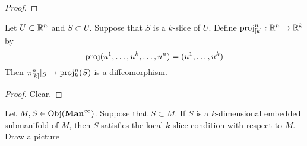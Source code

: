 \documentclass{book}
\begin{document}
	\begin{proof}
	\end{proof}

	\begin{ex}
		Let $U \subset \mathbb{R}^n$ and $S \subset U$. Suppose that $S$ is a $k$-slice of $U$. Define $\operatorname{\text{proj}}^n_{[k]}: \mathbb{R}^n \rightarrow \mathbb{R}^k$ by $$\operatorname{\text{proj}}(u^1, \dots, u^k, \dots, u^n) = (u^1, \dots, u^k)$$ Then $\pi^n_{[k]}|_{S} \rightarrow \operatorname{\text{proj}}^n_{k}(S)$ is a diffeomorphism.
	\end{ex}	
	
	\begin{proof}
		Clear. 
	\end{proof}

	\begin{ex}
		Let $M,S \in \operatorname{Obj}(\operatorname*{\text{\textbf{Man}}^{\infty}})$. Suppose that $S \subset M$. If $S$ is a $k$-dimensional embedded submanifold of $M$, then $S$ satisfies the local $k$-slice condition with respect to $M$. \\
		 Draw a picture
	\end{ex}
\end{document}
